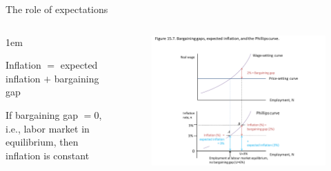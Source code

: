 \documentclass[11pt,aspectratio=43,usenames,dvipsnames]{beamer}
\let\olditemize=\itemize
\let\endolditemize=\enditemize
\renewenvironment{itemize}{\olditemize \itemsep1em}{\endolditemize}
\theoremstyle{definition}
\begin{document}
\begin{frame}{The role of expectations}
\label{slide:The_role_of_expectations}
\begin{columns}
    \begin{column}{0.3\textwidth}
        \begin{itemize}
            \item Inflation $ = $ expected inflation $ + $ bargaining gap
            \item If bargaining gap $ = 0 $, i.e., labor market in equilibrium, then inflation is constant
        \end{itemize}
    \end{column}
    \begin{column}{0.7\textwidth}
        \begin{figure}
            \centering
            \includegraphics[width=\textwidth]{./figures/10.pdf}
        \end{figure}

    \end{column}
\end{columns}

\end{frame}
\end{document}
